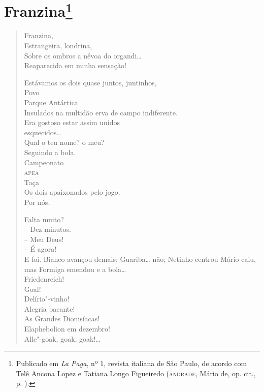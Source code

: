 \chapter{Franzina\footnote[*]{Publicado em \emph{La Paga}, nº 1, revista
  italiana de São Paulo, de acordo com Telê Ancona Lopez e Tatiana Longo
  Figueiredo (\textsc{andrade}, Mário de, op. cit., p. ).}}

\begin{verse}
Franzina,\\
Estrangeira, londrina,\\
Sobre os ombros a névoa do organdi\ldots{}\\
Reaparecida em minha sensação!

Estávamos os dois quase juntos, juntinhos,\\
\quad\quad\quad{}Povo\\
\quad\quad\quad{}Parque Antártica\\
Insulados na multidão erva de campo indiferente.\\
Era gostoso estar assim unidos\\
\quad\quad\quad\quad\quad\quad\quad{}esquecidos\ldots{}\\
Qual o teu nome? o meu?\\
Seguindo a bola.\\
\quad\quad\quad\quad{}Campeonato\\
\quad\quad\quad{}\textsc{apea}\\
\quad\quad{}Taça\\
Os dois apaixonados pelo jogo.\\
\quad\quad\quad\quad\quad{}Por nós.

Falta muito?\\
-- Dez minutos.\\
-- Meu Deus!\\
-- É agora!\\
E foi. Bianco avançou demais; Guariba\ldots{} não; Netinho centrou Mário caiu, mas Formiga emendou e a bola\ldots{}\\
\quad\quad\quad\quad\quad\quad{}Friedenreich!\\
\quad\quad\quad\quad\quad{}Goal!\\
\quad\quad\quad\quad{}Delírio"-vinho!\\
\quad\quad\quad{}Alegria bacante!\\
\quad\quad{}As Grandes Dionisíacas!\\
\quad{}Elaphebolion em dezembro!\\
Alle"-goak, goak, goak!\ldots{}


\end{verse}
